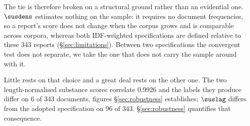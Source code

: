 The tie is therefore broken on a structural ground rather than an evidential one. $\susdens$
estimates nothing on the sample: it requires no document frequencies, so a report's score
does not change when the corpus grows and is comparable across corpora, whereas both
IDF-weighted specifications are defined relative to these 343 reports
(\S\ref{sec:limitations}). Between two specifications the convergent test does not separate,
we take the one that does not carry the sample around with it.

Little rests on that choice and a great deal rests on the other one. The two
length-normalised substance scores correlate 0.9926 and the labels they produce differ on 6
of 343 documents, figures \S\ref{sec:robustness} establishes; $\suslag$ differs from the
adopted specification on 96 of 343. \S\ref{sec:robustness} quantifies that consequence.
